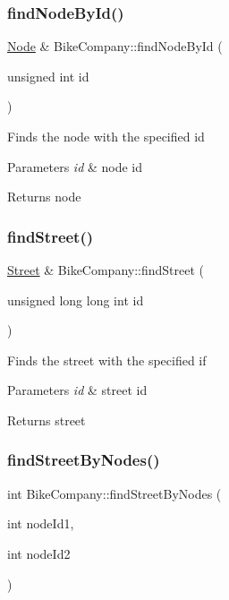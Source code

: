 \subsubsection{\texorpdfstring{find\+Node\+By\+Id()}{findNodeById()}}
{\footnotesize\ttfamily \mbox{\hyperlink{class_node}{Node}} \& Bike\+Company\+::find\+Node\+By\+Id (\begin{DoxyParamCaption}\item[{unsigned int}]{id }\end{DoxyParamCaption})}

Finds the node with the specified id 
\begin{DoxyParams}{Parameters}
{\em id} & node id \\
\hline
\end{DoxyParams}
\begin{DoxyReturn}{Returns}
node 
\end{DoxyReturn}
\mbox{\label{class_bike_company_a17955d80bd12b199559b72be003f601a}} 
\subsubsection{\texorpdfstring{find\+Street()}{findStreet()}}
{\footnotesize\ttfamily \mbox{\hyperlink{class_street}{Street}} \& Bike\+Company\+::find\+Street (\begin{DoxyParamCaption}\item[{unsigned long long int}]{id }\end{DoxyParamCaption})}

Finds the street with the specified if 
\begin{DoxyParams}{Parameters}
{\em id} & street id \\
\hline
\end{DoxyParams}
\begin{DoxyReturn}{Returns}
street 
\end{DoxyReturn}
\mbox{\label{class_bike_company_a70a2863261f0b9b2087c2ed012a17434}} 
\subsubsection{\texorpdfstring{find\+Street\+By\+Nodes()}{findStreetByNodes()}}
{\footnotesize\ttfamily int Bike\+Company\+::find\+Street\+By\+Nodes (\begin{DoxyParamCaption}\item[{int}]{node\+Id1,  }\item[{int}]{node\+Id2 }\end{DoxyParamCaption})}

